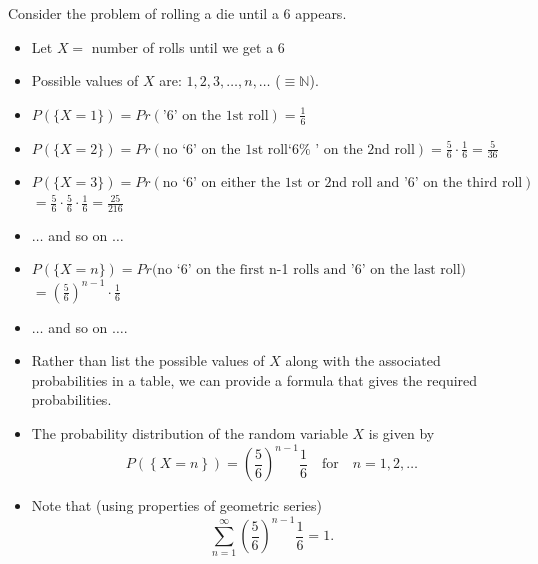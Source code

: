 \documentclass[smaller, handout]{beamer}\usepackage[]{graphicx}\usepackage[]{color}
\newenvironment{stepitemize}{\begin{itemize}[<+->]}{\end{itemize} }
\begin{document}
\begin{frame}{\secname}
  \begin{example}
  Consider the problem of rolling a die until a 6 appears.
  \begin{stepitemize}
  \item Let $X=$ number of rolls until we get a 6

  \item Possible values of $X$ are: $1, 2, 3,\ldots,n,\ldots$ ($\equiv
  \mathbb{N}$).

  \item $P(\{X=1\}) =Pr(\text{'6' on the 1st roll})= \frac{1}{6}$

  \item $P (\{X=2\})=Pr \left( \text{no `}6\text{' on the 1st roll`}6\text{%
  ' on the 2nd roll}\right) =\frac{5}{6}\cdot \frac{1}{6}=\frac{5}{36}$

  \item $P(\{X=3\})=Pr \left( \text{no `}6\text{' on either the 1st or 2nd
  roll and '6' on the third roll}\right)$\newline
  $=\frac{5}{6}\cdot \frac{5}{6}\cdot \frac{1}{6}=\frac{25}{216}$
  \item $\ldots$ and so on $\ldots$
  \item $P(\{X=n\})=Pr( \text{no `}6\text{' on the first }$n-1$\text{ rolls
  and '6' on the last roll})$ \newline
  $=\left(\frac{5}{6}\right)^{n-1}\cdot \frac{1}{6}$
  \item $\ldots$ and so on $\ldots$.
  \end{stepitemize}


  \end{example}
\end{frame}

\begin{frame}{\secname}
  \begin{example}[continued]
  \begin{stepitemize}
  \item Rather than list the possible values of $X$ along with the associated
  probabilities in a table, we can provide a formula that gives the required
  probabilities.

  \item The probability distribution of the random variable $X$
  is given by
  \begin{equation*}
  P(\left\{ X=n \right\})=\left(\frac{5}{6}\right)^{n-1}\frac{1}{6}\quad\text{for}%
  \quad n=1,2,\ldots
  \end{equation*}

  \item Note that (using properties of geometric series)
  \begin{equation*}
  \sum_{n=1}^\infty\left(\frac{5}{6}\right)^{n-1}\frac{1}{6}=1.
  \end{equation*}
  \end{stepitemize}

  \end{example}
\end{frame}%
\end{document}
